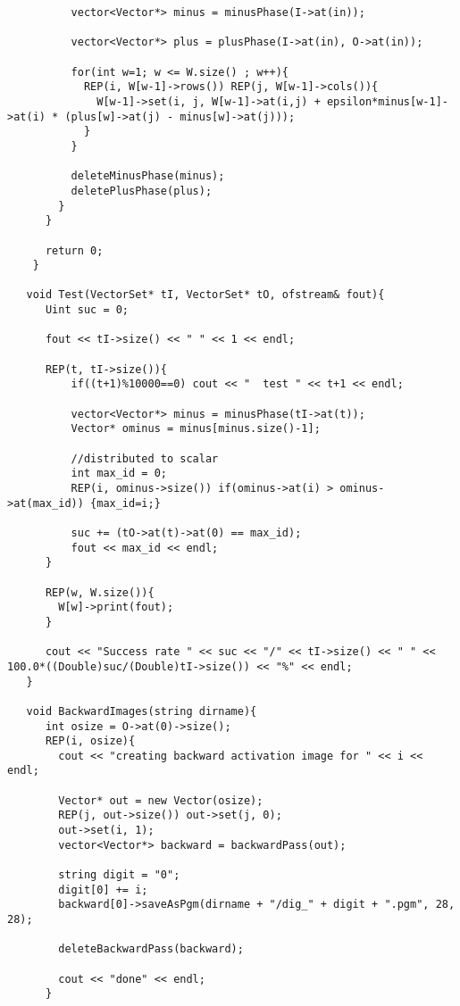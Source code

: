 \begin{lstlisting}
          vector<Vector*> minus = minusPhase(I->at(in)); 
          
          vector<Vector*> plus = plusPhase(I->at(in), O->at(in)); 
        
          for(int w=1; w <= W.size() ; w++){  
            REP(i, W[w-1]->rows()) REP(j, W[w-1]->cols()){
              W[w-1]->set(i, j, W[w-1]->at(i,j) + epsilon*minus[w-1]->at(i) * (plus[w]->at(j) - minus[w]->at(j))); 
            }
          }
          
          deleteMinusPhase(minus);
          deletePlusPhase(plus);
        } 
      }
      
      return 0;
    }
    
   void Test(VectorSet* tI, VectorSet* tO, ofstream& fout){
      Uint suc = 0; 
      
      fout << tI->size() << " " << 1 << endl;
      
      REP(t, tI->size()){
          if((t+1)%10000==0) cout << "  test " << t+1 << endl;
          
          vector<Vector*> minus = minusPhase(tI->at(t)); 
          Vector* ominus = minus[minus.size()-1];
          
          //distributed to scalar
          int max_id = 0;
          REP(i, ominus->size()) if(ominus->at(i) > ominus->at(max_id)) {max_id=i;}
          
          suc += (tO->at(t)->at(0) == max_id); 
          fout << max_id << endl;
      }
      
      REP(w, W.size()){
        W[w]->print(fout);
      }
      
      cout << "Success rate " << suc << "/" << tI->size() << " " << 100.0*((Double)suc/(Double)tI->size()) << "%" << endl; 
   }
   
   void BackwardImages(string dirname){
      int osize = O->at(0)->size();
      REP(i, osize){
        cout << "creating backward activation image for " << i << endl;
        
        Vector* out = new Vector(osize);
        REP(j, out->size()) out->set(j, 0); 
        out->set(i, 1); 
        vector<Vector*> backward = backwardPass(out); 
        
        string digit = "0";
        digit[0] += i; 
        backward[0]->saveAsPgm(dirname + "/dig_" + digit + ".pgm", 28, 28);
        
        deleteBackwardPass(backward); 
        
        cout << "done" << endl;
      }
      

\end{lstlisting}
